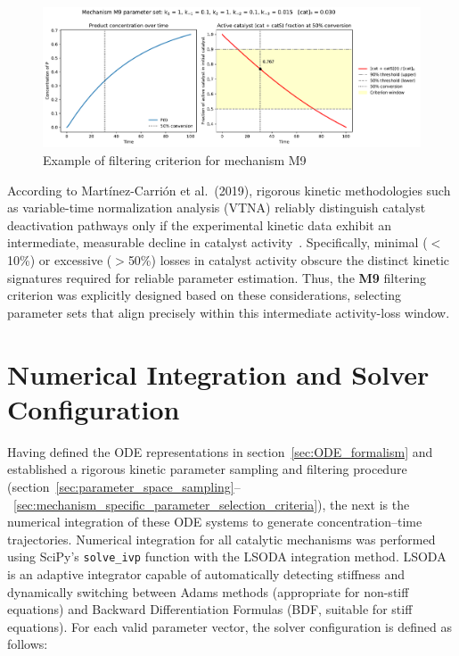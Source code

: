 \documentclass{dissertation}
\begin{document}
\begin{figure}[H]
    \centering
    \includegraphics[width=\textwidth]{data_generation/M9.pdf}
    \caption{Example of filtering criterion for mechanism M9}
    \label{fig:M9_criterion}
\end{figure}


According to Martínez-Carrión et al.\ (2019), rigorous kinetic methodologies such as variable-time normalization analysis (VTNA) reliably distinguish catalyst deactivation pathways only if the experimental kinetic data exhibit an intermediate, measurable decline in catalyst activity~\cite{MartinezCarrion2019}. Specifically, minimal ($<$10\%) or excessive ($>$50\%) losses in catalyst activity obscure the distinct kinetic signatures required for reliable parameter estimation. Thus, the \textbf{M9} filtering criterion was explicitly designed based on these considerations, selecting parameter sets that align precisely within this intermediate activity-loss window.

\section{Numerical Integration and Solver Configuration}
\label{sec:numerical_integration}

Having defined the ODE representations in section~\ref{sec:ODE_formalism} and established a rigorous kinetic parameter sampling and filtering procedure (section~\ref{sec:parameter_space_sampling}–~\ref{sec:mechanism_specific_parameter_selection_criteria}), the next is the numerical integration of these ODE systems to generate concentration–time trajectories. Numerical integration for all catalytic mechanisms was performed using SciPy’s \texttt{solve\_ivp} function with the LSODA integration method. LSODA is an adaptive integrator capable of automatically detecting stiffness and dynamically switching between Adams methods (appropriate for non-stiff equations) and Backward Differentiation Formulas (BDF, suitable for stiff equations). For each valid parameter vector, the solver configuration is defined as follows:
\end{document}
